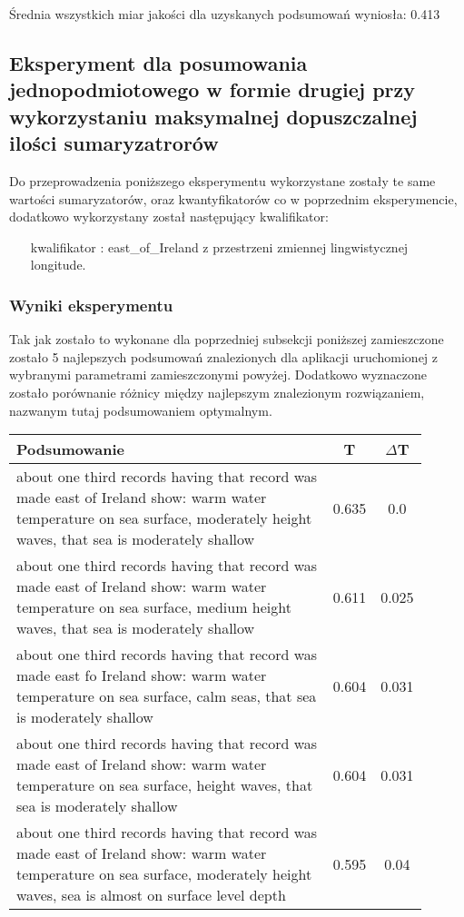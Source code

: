 \documentclass{article}
\begin{document}
\noindent Średnia wszystkich miar jakości dla uzyskanych podsumowań wyniosła: 0.413



\subsection{Eksperyment dla posumowania jednopodmiotowego w formie drugiej przy wykorzystaniu maksymalnej dopuszczalnej ilości sumaryzatrorów}

Do przeprowadzenia poniższego eksperymentu wykorzystane zostały te same wartości sumaryzatorów, oraz kwantyfikatorów co w poprzednim eksperymencie, dodatkowo wykorzystany został następujący kwalifikator:

\begin{itemize}
    \item[kwalifikator]: east\_of\_Ireland z przestrzeni zmiennej lingwistycznej longitude.
\end{itemize}

\subsubsection{Wyniki eksperymentu}

\noindent Tak jak zostało to wykonane dla poprzedniej subsekcji poniższej zamieszczone zostało 5 najlepszych podsumowań znalezionych dla aplikacji uruchomionej z wybranymi parametrami zamieszczonymi powyżej. Dodatkowo wyznaczone zostało porównanie różnicy między najlepszym znalezionym rozwiązaniem, nazwanym tutaj podsumowaniem optymalnym.

\begin{longtable}{|p{0.9\linewidth}|c|c|}
\hline
\textbf{Podsumowanie} & \textbf{T} & \textbf{\(\Delta \)T} \\
\hline
about one third records having that record was made east of Ireland show: warm water temperature on sea surface, moderately height waves, that sea is moderately shallow & 0.635 & 0.0 \\ \hline
about one third records having that record was made east of Ireland show: warm water temperature on sea surface, medium height waves, that sea is moderately shallow & 0.611 & 0.025 \\ \hline
about one third records having that record was made east fo Ireland show: warm water temperature on sea surface, calm seas, that sea is moderately shallow & 0.604 & 0.031 \\ \hline
about one third records having that record was made east of Ireland show: warm water temperature on sea surface, height waves, that sea is moderately shallow & 0.604 & 0.031 \\ \hline
about one third records having that record was made east of Ireland show: warm water temperature on sea surface, moderately height waves, sea is almost on surface level depth & 0.595 & 0.04 \\ \hline
\hline
\end{longtable}
\end{document}
